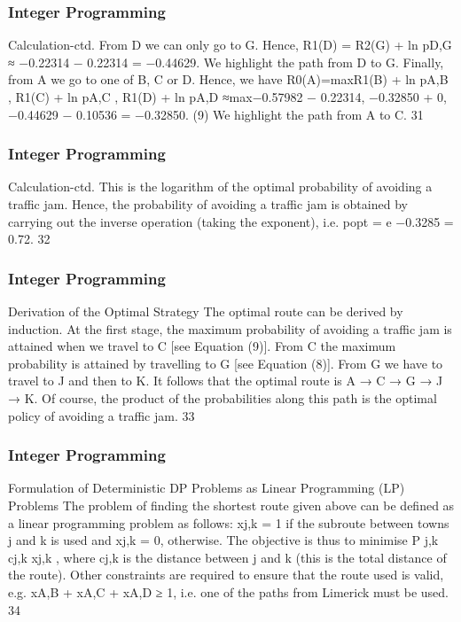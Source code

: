\begin{frame} 
\frametitle{Integer Programming}     
Calculation-ctd.
From D we can only go to G. Hence,
R1(D) = R2(G) + ln pD,G ≈ −0.22314 − 0.22314 = −0.44629.
We highlight the path from D to G.
Finally, from A we go to one of B, C or D. Hence, we have
R0(A)=max{R1(B) + ln pA,B , R1(C) + ln pA,C , R1(D) + ln pA,D}
≈max{−0.57982 − 0.22314, −0.32850 + 0,
−0.44629 − 0.10536} = −0.32850. (9)
We highlight the path from A to C.
31 \end{frame}  \begin{frame} \frametitle{Integer Programming}     
Calculation-ctd.
This is the logarithm of the optimal probability of avoiding a traffic
jam.
Hence, the probability of avoiding a traffic jam is obtained by
carrying out the inverse operation (taking the exponent), i.e.
popt = e
−0.3285 = 0.72.
32 \end{frame}  \begin{frame} \frametitle{Integer Programming}     
Derivation of the Optimal Strategy
The optimal route can be derived by induction.
At the first stage, the maximum probability of avoiding a traffic
jam is attained when we travel to C [see Equation (9)].
From C the maximum probability is attained by travelling to G
[see Equation (8)]. From G we have to travel to J and then to K.
It follows that the optimal route is A → C → G → J → K. Of
course, the product of the probabilities along this path is the
optimal policy of avoiding a traffic jam.
33 \end{frame}  \begin{frame} \frametitle{Integer Programming}     
Formulation of Deterministic DP Problems as Linear
Programming (LP) Problems
The problem of finding the shortest route given above can be
defined as a linear programming problem as follows:
xj,k = 1 if the subroute between towns j and k is used and
xj,k = 0, otherwise.
The objective is thus to minimise P
j,k
cj,k xj,k , where cj,k is the
distance between j and k (this is the total distance of the route).
Other constraints are required to ensure that the route used is
valid, e.g. xA,B + xA,C + xA,D ≥ 1, i.e. one of the paths from
Limerick must be used.
34 \end{frame}  
